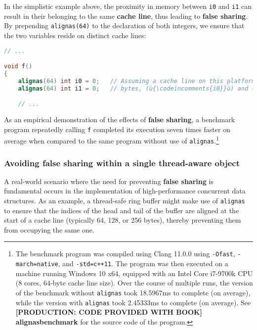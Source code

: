 \noindent In the simplistic example above, the proximity in memory between
\texttt{i0} and \texttt{i1} can result in their belonging to the same
\textbf{cache line}, thus leading to \textbf{false sharing}. By
prepending \texttt{alignas(64)} to the declaration of both integers, we
ensure that the two variables reside on distinct cache lines:

\begin{lstlisting}[language=C++]
// ...

void f()
{
    alignas(64) int i0 = 0;   // Assuming a cache line on this platform is 64
    alignas(64) int i1 = 0;   // bytes, (ù{\codeincomments{i0}}ù) and (ù{\codeincomments{i1}}ù) will be on separate ones.

    // ...
\end{lstlisting}

\noindent As an empirical demonstration of the effects of \textbf{false sharing},
a benchmark program repeatedly calling \texttt{f} completed its
execution seven times faster on average when compared to the same
program without use of \texttt{alignas}.{\cprotect\footnote{The benchmark
program was compiled using Clang 11.0.0 using \texttt{-Ofast},
\texttt{-march=native}, and \mbox{\texttt{-std=c++11}}. The program was then
executed on a machine running Windows 10 x64, equipped with an Intel
Core i7-9700k CPU (8 cores, 64-byte cache line size). Over the
course of multiple runs, the version of the benchmark without
\texttt{alignas} took 18.5967ms to complete (on average), while the
version with \texttt{alignas} took 2.45333ms to complete (on average).
  See \textbf{{[PRODUCTION: CODE PROVIDED WITH BOOK] alignasbenchmark}} for the source code of the program.}}

\subsubsection[Avoiding \textbf{false sharing} within a single thread-aware object]{Avoiding \textbf{false sharing} within a single thread-aware object}\label{avoiding-false-sharing-within-a-single-thread-aware-object}

A real-world scenario where the need for preventing \textbf{false
sharing} is fundamental occurs in the implementation of high-performance
concurrent data structures. As an example, a thread-safe ring buffer
might make use of \texttt{alignas} to ensure that the indices of the
head and tail of the buffer are aligned at the start of a cache line
(typically 64, 128, or 256 bytes), thereby preventing them from
occupying the same one.

